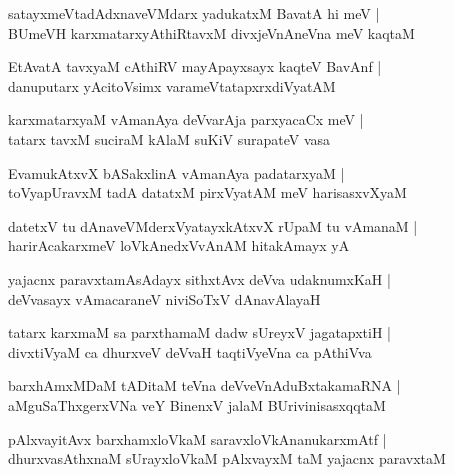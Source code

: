 \begin{shloka}
satayxmeVtadAdxnaveVMdarx yadukatxM BavatA hi meV |\\
BUmeVH karxmatarxyAthiRtavxM divxjeVnAneVna meV kaqtaM
\end{shloka}

\begin{shloka}
EtAvatA tavxyaM cAthiRV mayApayxsayx kaqteV BavAnf |\\
danuputarx yAcitoVsimx varameVtatapxrxdiVyatAM
\end{shloka}

\begin{shloka}
karxmatarxyaM vAmanAya deVvarAja parxyacaCx meV |\\
tatarx tavxM suciraM kAlaM suKiV surapateV vasa
\end{shloka}

\begin{shloka}
EvamukAtxvX bASakxlinA vAmanAya padatarxyaM |\\
toVyapUravxM tadA datatxM pirxVyatAM meV harisasxvXyaM 
\end{shloka}

\begin{shloka}
datetxV tu dAnaveVMderxVyatayxkAtxvX rUpaM tu vAmanaM |\\
harirAcakarxmeV loVkAnedxVvAnAM hitakAmayx yA
\end{shloka}

\begin{shloka}
yajacnx paravxtamAsAdayx sithxtAvx deVva udaknumxKaH |\\
deVvasayx vAmacaraneV niviSoTxV dAnavAlayaH 
\end{shloka}

\begin{shloka}
tatarx karxmaM sa parxthamaM dadw sUreyxV jagatapxtiH |\\
divxtiVyaM ca dhurxveV deVvaH taqtiVyeVna ca pAthiVva
\end{shloka}

\begin{shloka}
barxhAmxMDaM tADitaM teVna deVveVnAduBxtakamaRNA |\\
aMguSaThxgerxVNa veY BinenxV jalaM BUrivinisasxqqtaM
\end{shloka}

\begin{shloka}
pAlxvayitAvx barxhamxloVkaM saravxloVkAnanukarxmAtf |\\
dhurxvasAthxnaM sUrayxloVkaM pAlxvayxM taM yajacnx paravxtaM 
\end{shloka}

